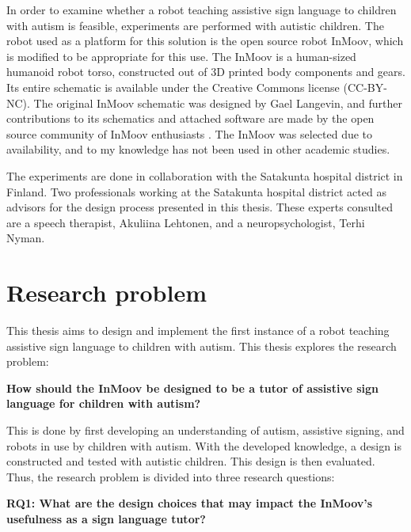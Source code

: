 In order to examine whether a robot teaching assistive sign language to children with autism is feasible, experiments are performed with autistic children. The robot used as a platform for this solution is the open source robot InMoov, which is modified to be appropriate for this use. The InMoov is a human-sized humanoid robot torso, constructed out of 3D printed body components and gears. Its entire schematic is available under the Creative Commons license (CC-BY-NC). The original InMoov schematic was designed by Gael Langevin, and further contributions to its schematics and attached software are made by the open source community of InMoov enthusiasts \cite{inmoov}. The InMoov was selected due to availability, and to my knowledge has not been used in other academic studies.

The experiments are done in collaboration with the Satakunta hospital district in Finland. Two professionals working at the Satakunta hospital district acted as advisors for the design process presented in this thesis. These experts consulted are a speech therapist, Akuliina Lehtonen, and a neuropsychologist, Terhi Nyman. 



\section{Research problem}

This thesis aims to design and implement the first instance of a robot teaching assistive sign language to children with autism. This thesis explores the research problem:

\vspace{3mm}
\noindent\textbf{How should the InMoov be designed to be a tutor of assistive sign language for children with autism?}
\vspace{3mm}

This is done by first developing an understanding of autism, assistive signing, and robots in use by children with autism. With the developed knowledge, a design is constructed and tested with autistic children. This design is then evaluated. Thus, the research problem is divided into three research questions:


\vspace{3mm}

\noindent\textbf{RQ1: What are the design choices that may impact the InMoov's usefulness as a sign language tutor?}
\vspace{3mm}

